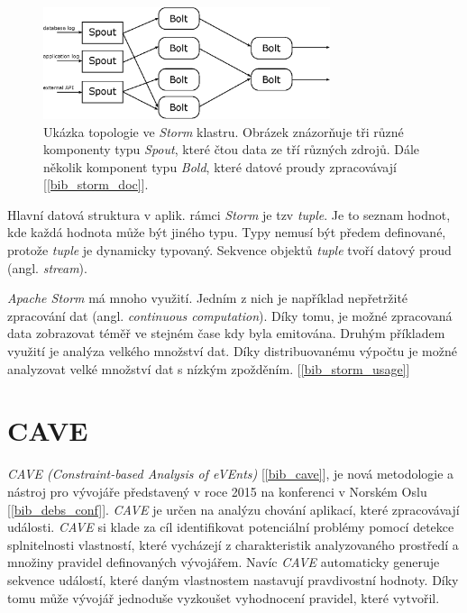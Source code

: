 \documentclass[
  digital, %
  table,   %
  nolof,     %
  nolot,     %
  oneside, %
  nocover,
  monochrome,
  12pt
]{fithesis3}
\begin{document}
\begin{figure}[H]
	\centering
    \includegraphics[width=0.75\textwidth, height=0.2\textheight]{images/storm-topology.eps}
    \caption{Ukázka topologie ve \textit{Storm} klastru. Obrázek znázorňuje tři různé komponenty typu \textit{Spout}, které čtou data ze tří různých zdrojů. Dále několik komponent typu \textit{Bold}, které datové proudy zpracovávají [\ref{bib_storm_doc}].}
    \label{fig:storm-topology}
\end{figure}

Hlavní datová struktura v aplik. rámci \textit{Storm} je tzv \textit{tuple}. Je to seznam hodnot, kde každá hodnota může být jiného typu. Typy nemusí být předem definované, protože \textit{tuple} je dynamicky typovaný. Sekvence objektů \textit{tuple} tvoří datový proud (angl. \textit{stream}).

\textit{Apache Storm} má mnoho využití. Jedním z nich je například nepřetržité zpracování dat (angl. \textit{continuous computation}). Díky tomu, je možné zpracovaná data zobrazovat téměř ve stejném čase kdy byla emitována. Druhým příkladem využití je analýza velkého množství dat. Díky distribuovanému výpočtu je možné analyzovat velké množství dat s nízkým zpožděním. [\ref{bib_storm_usage}]

\section{CAVE}
\textit{CAVE (Constraint-based Analysis of eVEnts)} [\ref{bib_cave}], je nová metodologie a nástroj pro vývojáře představený v roce 2015 na konferenci v Norském Oslu [\ref{bib_debs_conf}]. \textit{CAVE} je určen na analýzu chování aplikací, které zpracovávají události. \textit{CAVE} si klade za cíl identifikovat potenciální problémy pomocí detekce splnitelnosti vlastností, které vycházejí z charakteristik analyzovaného prostředí a množiny pravidel definovaných vývojářem. Navíc \textit{CAVE} automaticky generuje sekvence událostí, které daným vlastnostem nastavují pravdivostní hodnoty. Díky tomu může vývojář jednoduše vyzkoušet vyhodnocení pravidel, které vytvořil.
\end{document}
